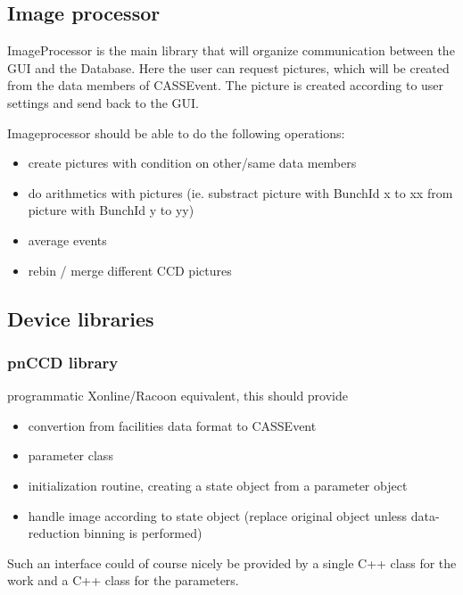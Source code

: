 \documentclass[11pt,a4paper,oneside]{article}
\begin{document}
\subsection{Image processor}
\label{sec:image-processor}

ImageProcessor is the main library that will organize communication between the GUI and the Database. Here the user can request pictures, which will be created from the data members of CASSEvent. The picture is created according to user settings and send back to the GUI.

Imageprocessor should be able to do the following operations:
\begin{itemize}
	\item create pictures with condition on other/same data members
	\item do arithmetics with pictures (ie. substract picture with BunchId x to xx from picture with BunchId y to yy)
	\item average events
	\item rebin / merge different CCD pictures
\end{itemize}

%

\subsection{Device libraries}
\label{sec:device-libraries}

\subsubsection{pnCCD library}
\label{sec:pnccd-library}
programmatic Xonline/Racoon equivalent, this should provide

\begin{itemize}
\item convertion from facilities data format to CASSEvent
\item parameter class
\item initialization routine, creating a state object from a parameter object
\item handle image according to state object (replace original object unless data-reduction binning is performed)
\end{itemize}
Such an interface could of course nicely be provided by a single C++ class for the work and a C++ class for the parameters.
\end{document}
